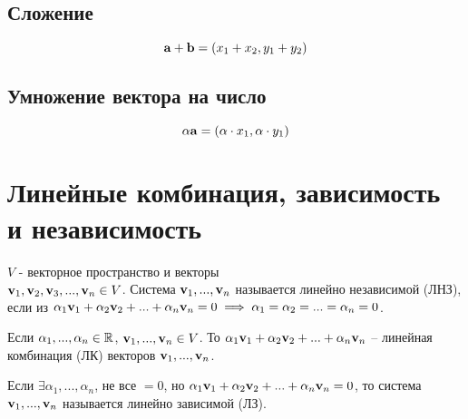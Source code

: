 \documentclass[main]{subfiles}
\begin{document}
\subsection{Сложение}
\begin{equation*}
    \mathbf{a} + \mathbf{b} = (x_1+x_2, y_1+y_2)
\end{equation*}

\subsection{Умножение вектора на число}
\begin{equation*}
    \alpha \mathbf{a} = (\alpha\cdot x_1, \alpha\cdot y_1)
\end{equation*}

\section[ЛК, ЛЗ и ЛНЗ]{Линейные комбинация, зависимость и независимость}
\begin{definition}
    $V$ - векторное пространство и векторы \\ $\mathbf{v}_1,\mathbf{v}_2,\mathbf{v}_3,..., \mathbf{v}_n \in V$.
    Система $\mathbf{v}_1,...,\mathbf{v}_n$ называется линейно независимой (ЛНЗ), если из
    $\alpha_1 \mathbf{v}_1 + \alpha_2 \mathbf{v}_2 + ... + \alpha_n \mathbf{v}_n = 0 \implies \alpha_1=\alpha_2=...=\alpha_n =0$.
\end{definition}

\begin{definition}
    Если $\alpha_1,..., \alpha_n \in \mathbb{R}$, $\mathbf{v}_1,...,\mathbf{v}_n \in V$.
    То $\alpha_1 \mathbf{v}_1 + \alpha_2 \mathbf{v}_2 + ... + \alpha_n \mathbf{v}_n$ -- линейная комбинация (ЛК)
    векторов $\mathbf{v}_1,...,\mathbf{v}_n$.
\end{definition}

\begin{definition}
    Если $\exists \alpha_1,..., \alpha_n$, не все $=0$, но $\alpha_1 \mathbf{v}_1 + \alpha_2 \mathbf{v}_2 + ... + \alpha_n \mathbf{v}_n = 0$,
    то система $\mathbf{v}_1,...,\mathbf{v}_n$ называется линейно зависимой (ЛЗ).
\end{definition}
\end{document}
